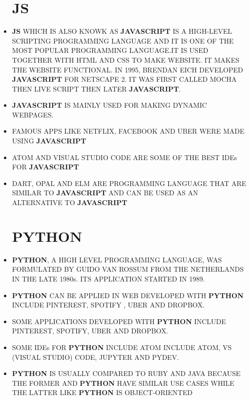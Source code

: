 \documentclass[12pt]{article}
\begin{document}
\begin{itemize}
	\section{JS}
	\item
	\textbf{JS }WHICH IS ALSO KNOWK AS \textbf{JAVASCRIPT} IS A HIGH-LEVEL SCRIPTING PROGRAMMING LANGUAGE AND IT IS ONE OF THE MOST POPULAR PROGRAMMING LANGUAGE.IT IS USED TOGETHER WITH HTML AND CSS TO MAKE WEBSITE. IT MAKES THE WEBSITE FUNCTIONAL. IN 1995, BRENDAN EICH DEVELOPED \textbf{JAVASCRIPT} FOR NETSCAPE 2. IT WAS FIRST CALLED MOCHA THEN LIVE SCRIPT THEN LATER \textbf{JAVASCRIPT}.
	\item
	\textbf{JAVASCRIPT} IS MAINLY USED FOR MAKING DYNAMIC WEBPAGES.
	\item
	FAMOUS APPS LIKE NETFLIX, FACEBOOK AND UBER WERE MADE USING \textbf{JAVASCRIPT}
	\item
	ATOM AND VISUAL STUDIO CODE ARE SOME OF THE BEST IDEs FOR \textbf{JAVASCRIPT}
	\item
	DART, OPAL AND ELM ARE PROGRAMMING LANGUAGE THAT ARE SIMILAR TO \textbf{JAVASCRIPT} AND CAN BE USED AS AN ALTERNATIVE TO \textbf{JAVASCRIPT}
	 
	\newpage
	\section{PYTHON}
	\item
	\textbf{PYTHON}, A HIGH LEVEL PROGRAMMING LANGUAGE, WAS FORMULATED BY GUIDO VAN ROSSUM FROM THE NETHERLANDS IN THE LATE 1980s. ITS APPLICATION STARTED IN 1989.
	\item
	\textbf{PYTHON} CAN BE APPLIED IN WEB DEVELOPED WITH \textbf{PYTHON} INCLUDE PINTEREST, SPOTIFY , UBER AND DROPBOX.
	\item
	SOME APPLICATIONS DEVELOPED WITH \textbf{PYTHON} INCLUDE PINTEREST, SPOTIFY, UBER AND DROPBOX. 
	\item
	SOME IDEs FOR \textbf{PYTHON} INCLUDE ATOM INCLUDE ATOM, VS (VISUAL STUDIO) CODE, JUPYTER AND PYDEV.
	\item
	\textbf{PYTHON} IS USUALLY COMPARED TO RUBY AND JAVA BECAUSE THE FORMER AND \textbf{PYTHON} HAVE SIMILAR USE CASES WHILE THE LATTER LIKE \textbf{PYTHON} IS OBJECT-ORIENTED
	\newpage

\end{itemize}
\end{document}
